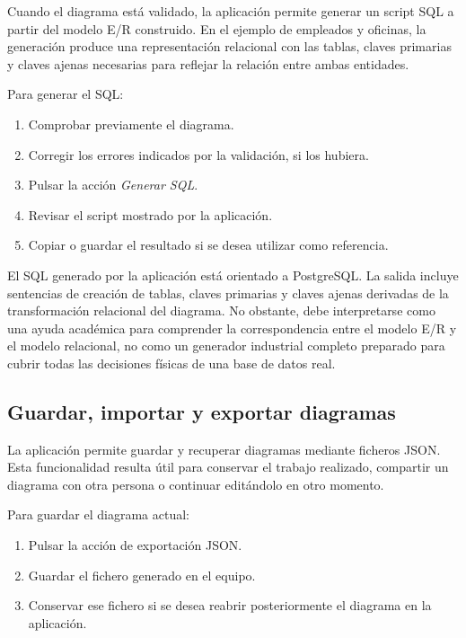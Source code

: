 Cuando el diagrama está validado, la aplicación permite generar un script SQL a partir del modelo E/R construido. En el ejemplo de empleados y oficinas, la generación produce una representación relacional con las tablas, claves primarias y claves ajenas necesarias para reflejar la relación entre ambas entidades.

Para generar el SQL:

\begin{enumerate}
    \item Comprobar previamente el diagrama.
    \item Corregir los errores indicados por la validación, si los hubiera.
    \item Pulsar la acción \textit{Generar SQL}.
    \item Revisar el script mostrado por la aplicación.
    \item Copiar o guardar el resultado si se desea utilizar como referencia.
\end{enumerate}


El SQL generado por la aplicación está orientado a PostgreSQL. La salida incluye sentencias de creación de tablas, claves primarias y claves ajenas derivadas de la transformación relacional del diagrama. No obstante, debe interpretarse como una ayuda académica para comprender la correspondencia entre el modelo E/R y el modelo relacional, no como un generador industrial completo preparado para cubrir todas las decisiones físicas de una base de datos real.

\subsection{Guardar, importar y exportar diagramas}

La aplicación permite guardar y recuperar diagramas mediante ficheros JSON. Esta funcionalidad resulta útil para conservar el trabajo realizado, compartir un diagrama con otra persona o continuar editándolo en otro momento.

Para guardar el diagrama actual:

\begin{enumerate}
    \item Pulsar la acción de exportación JSON.
    \item Guardar el fichero generado en el equipo.
    \item Conservar ese fichero si se desea reabrir posteriormente el diagrama en la aplicación.
\end{enumerate}

